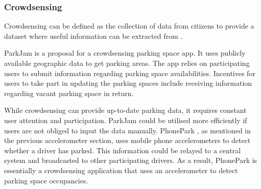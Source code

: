\subsubsection*{Crowdsensing}
Crowdsensing can be defined as the collection of data from citizens to provide a dataset where useful information can be extracted from \citep{Villanueva2016CrowdsensingMonitoring}. 

ParkJam \citep{Kopeck2012PARKJAM:Demo} is a proposal for a crowdsensing parking space app. It uses publicly available geographic data to get parking areas. The app relies on participating users to submit information regarding parking space availabilities. Incentives for users to take part in updating the parking spaces include receiving information regarding vacant parking space in return.

While crowdsensing can provide up-to-date parking data, it requires constant user attention and participation. ParkJam could be utilised more efficiently if users are not obliged to input the data manually. PhonePark \citep{xu_real-time_2013}, as mentioned in the previous accelerometer section, uses mobile phone accelerometers to detect whether a driver has parked. This information could be relayed to a central system and broadcasted to other participating drivers. As a result, PhonePark is essentially a crowdsensing application that uses an accelerometer to detect parking space occupancies.